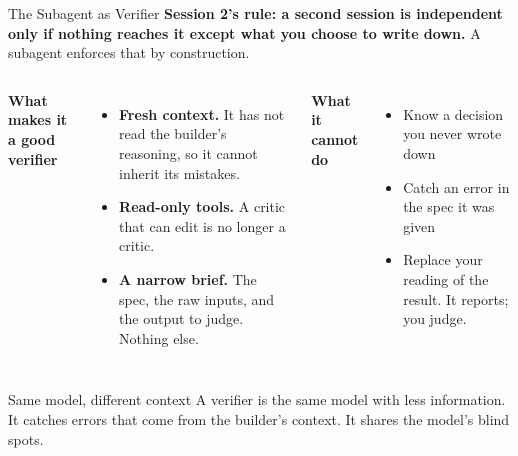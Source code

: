 \documentclass[aspectratio=169, 11pt]{beamer}
\begin{document}
\begin{frame}{The Subagent as Verifier}
  \textbf{Session 2's rule: a second session is independent only if nothing reaches it except what you choose to write down.} A subagent enforces that by construction.

  \vspace{0.5em}
  \begin{columns}[T]
    \textbf{What makes it a good verifier}
    \begin{itemize}\small
      \item \textbf{Fresh context.} It has not read the builder's reasoning, so it cannot inherit its mistakes.
      \item \textbf{Read-only tools.} A critic that can edit is no longer a critic.
      \item \textbf{A narrow brief.} The spec, the raw inputs, and the output to judge. Nothing else.
    \end{itemize}

    \textbf{What it cannot do}
    \begin{itemize}\small
      \item Know a decision you never wrote down
      \item Catch an error in the spec it was given
      \item Replace your reading of the result. It reports; you judge.
    \end{itemize}
  \end{columns}

  \vspace{0.6em}
  \begin{block}{Same model, different context}
    A verifier is the same model with less information. It catches errors that come from the builder's context. It shares the model's blind spots.
  \end{block}
\end{frame}
\end{document}
